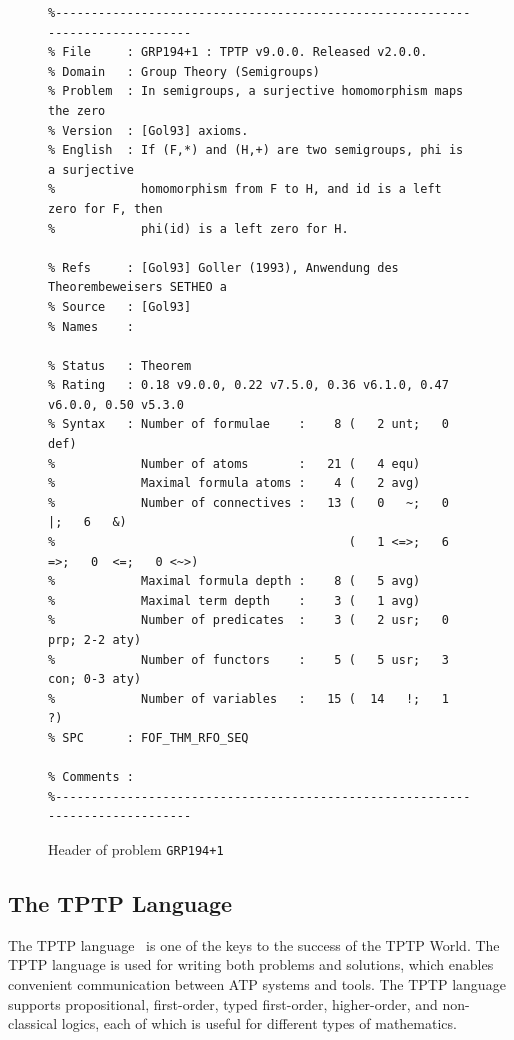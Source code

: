 \documentclass[runningheads]{llncs}
\begin{document}
\begin{figure}[htb]
\centering
{\scriptsize
{\setlength{\baselineskip}{2.5mm}
\begin{verbatim}
%------------------------------------------------------------------------------
% File     : GRP194+1 : TPTP v9.0.0. Released v2.0.0.
% Domain   : Group Theory (Semigroups)
% Problem  : In semigroups, a surjective homomorphism maps the zero
% Version  : [Gol93] axioms.
% English  : If (F,*) and (H,+) are two semigroups, phi is a surjective
%            homomorphism from F to H, and id is a left zero for F, then 
%            phi(id) is a left zero for H.

% Refs     : [Gol93] Goller (1993), Anwendung des Theorembeweisers SETHEO a
% Source   : [Gol93]
% Names    :

% Status   : Theorem
% Rating   : 0.18 v9.0.0, 0.22 v7.5.0, 0.36 v6.1.0, 0.47 v6.0.0, 0.50 v5.3.0
% Syntax   : Number of formulae    :    8 (   2 unt;   0 def)
%            Number of atoms       :   21 (   4 equ)
%            Maximal formula atoms :    4 (   2 avg)
%            Number of connectives :   13 (   0   ~;   0   |;   6   &)
%                                         (   1 <=>;   6  =>;   0  <=;   0 <~>)
%            Maximal formula depth :    8 (   5 avg)
%            Maximal term depth    :    3 (   1 avg)
%            Number of predicates  :    3 (   2 usr;   0 prp; 2-2 aty)
%            Number of functors    :    5 (   5 usr;   3 con; 0-3 aty)
%            Number of variables   :   15 (  14   !;   1   ?)
% SPC      : FOF_THM_RFO_SEQ

% Comments :
%------------------------------------------------------------------------------
\end{verbatim}
}}
\caption{Header of problem {\tt GRP194+1}}
\label{ExampleHeader}
\end{figure}

\subsection{The TPTP Language}
\label{Languages}

The TPTP language~\cite{Sut23-IGPL} is one of the keys to the success of the TPTP World.
The TPTP language is used for writing both problems and solutions,
which enables convenient communication between ATP systems and tools.
The TPTP language supports propositional, first-order, typed first-order, higher-order, and
non-classical logics, each of which is useful for different types of mathematics.
\end{document}
